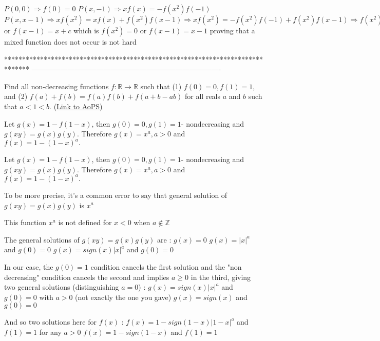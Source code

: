 \begin{solution}
	$P(0,0) \Rightarrow f(0)=0$
$P(x,-1) \Rightarrow xf(x)=-f(x^2)f(-1)$
$P(x,x-1) \Rightarrow xf(x^2)=xf(x)+f(x^2)f(x-1) \Rightarrow xf(x^2)=-f(x^2)f(-1)+f(x^2)f(x-1) \Rightarrow f(x^2)=0$ or $f(x-1)=x+c$ which is  $f(x^2)=0$ or $f(x-1)=x-1$ proving that a mixed function does not occur is not hard
\end{solution}
*******************************************************************************
-------------------------------------------------------------------------------

\begin{problem}
	Find all non-decreasing functions $f:\mathbb{R}\rightarrow\mathbb{R}$ such that
(1) $f(0)=0, f(1)=1$, and
(2) $f(a)+f(b)=f(a)f(b)+f(a+b-ab)$ for all reals $a$ and $b$ such that $a<1<b$.
	\flushright \href{https://artofproblemsolving.com/community/c6h404926}{(Link to AoPS)}
\end{problem}



\begin{solution}
	Let $g(x)=1-f(1-x)$, then $g(0)=0,g(1)=1$- nondecreasing and
$g(xy)=g(x)g(y)$. Therefore $g(x)=x^a, a>0$ and $f(x)=1-(1-x)^a.$
\end{solution}



\begin{solution}
	\begin{tcolorbox}Let $g(x)=1-f(1-x)$, then $g(0)=0,g(1)=1$- nondecreasing and
$g(xy)=g(x)g(y)$. Therefore $g(x)=x^a, a>0$ and $f(x)=1-(1-x)^a.$\end{tcolorbox}
To be more precise, it's a common error to say that general solution of $g(xy)=g(x)g(y)$ is $x^a$

This function $x^a$ is not defined for $x<0$ when $a\notin \mathbb Z$

The general solutions of $g(xy)=g(x)g(y)$ are :
$g(x)=0$
$g(x)=|x|^a$ and $g(0)=0$
$g(x)=sign(x)|x|^a$ and $g(0)=0$

In our case, the $g(0)=1$ condition cancels the first solution and the "non decreasing" condition cancels the second and implies $a\ge 0$ in the third, giving two general solutions (distinguishing $a=0$) :
$g(x)=sign(x)|x|^a$ and $g(0)=0$ with $a>0$ (not exactly the one you gave)
$g(x)=sign(x)$ and $g(0)=0$

And so two solutions here for $f(x)$ :
$f(x)=1-sign(1-x)|1-x|^a$ and $f(1)=1$ for any $a>0$
$f(x)=1-sign(1-x)$ and $f(1)=1$
\end{solution}



